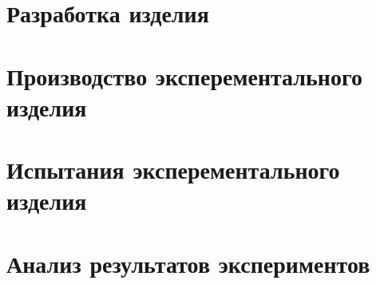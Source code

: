 \section{Разработка изделия}
\section{Производство эксперементального изделия}
\section{Испытания эксперементального изделия}
\section{Анализ результатов экспериментов}


